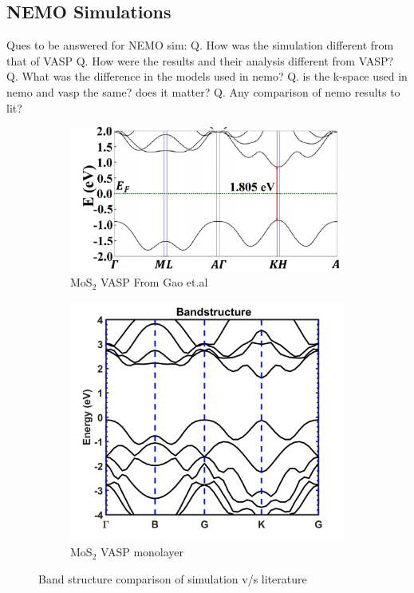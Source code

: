 \documentclass[microe]{ritthesis}
\begin{document}
\subsection{NEMO Simulations}
Ques to be answered for NEMO sim:
Q. How was the simulation different from that of VASP
Q. How were the results and their analysis different from VASP?
Q. What was the difference in the models used in nemo?
Q. is the k-space used in nemo and vasp the same? does it matter?
Q. Any comparison of nemo results to lit?


\begin{figure}
\centering
\begin{subfigure}{0.45\linewidth}
\centering
\includegraphics[width=\linewidth]{MoS2_DFT_lit.PNG}
\caption{MoS$_2$ VASP From Gao et.al \cite{Gao}}
\label{fig:sub:left}
\end{subfigure}
\quad\quad\quad\quad
\begin{subfigure}{0.4\linewidth}
\centering
\includegraphics[width=\linewidth]{MoS2_DFT_sim.png}
\caption{MoS$_2$ VASP monolayer}
\label{fig:sub:right}
\end{subfigure}
\caption{Band structure comparison of simulation v/s literature \cite{Gao}}
\label{fig:sub}
\end{figure}
\end{document}
